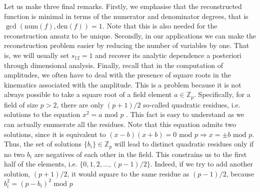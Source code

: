 \documentclass[main.tex]{subfiles}
\begin{document}
Let us make three final remarks. Firstly, we emphasise that the reconstructed function is minimal in terms of the numerator and denominator degrees, that is $\gcd \left(\text{num}(f), \text{den}(f) \right) = 1$. Note that this is also needed for the reconstruction ansatz to be unique.
Secondly, in our applications we can make the reconstruction problem easier by reducing the number of variables by one. That is, we will usually set $s_{12} = 1$ and recover its analytic dependence a posteriori through dimensional analysis. Finally, recall that in the computation of amplitudes, we often have to deal with the presence of square roots in the kinematics associated with the amplitude. This is a problem because it is not always possible to take a square root of a field element $a \in \mathbb{Z}_p$. Specifically, for a field of size $p>2$, there are only $(p+1)/2$ so-called quadratic residues, i.e. solutions to the equation $x^2=a \text{ mod } p$ \cite{hardy2008introduction}. This fact is easy to understand as we can actually enumerate all the residues. Note that this equation admits two solutions, since it is equivalent to $(x-b)(x+b)=0 \text{ mod } p \Longrightarrow x = \pm b \text{ mod } p$. Thus, the set of solutions $\{b_i\} \in \mathbb{Z}_p$ will lead to distinct quadratic residues only if no two $b_i$ are negatives of each other in the field. This constrains us to the first half of the elements, i.e. $\{0, 1, 2, \ldots, (p-1)/2 \}$. Indeed, if we try to add another solution, $(p+1)/2$, it would square to the same residue as $(p-1)/2$, because $b_i^2 = (p-b_i)^2 \text{ mod }p$
\end{document}
